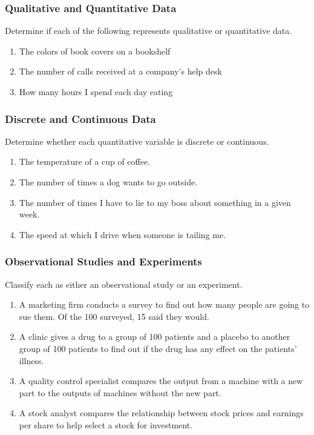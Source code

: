 \documentclass{article}
\newcounter{pset}
\begin{document}
\subsubsection*{Qualitative and Quantitative Data}

Determine if each of the following represents qualitative or quantitative data.
\begin{enumerate} \setcounter{enumi}{\value{pset}}
    \item The colors of book covers on a bookshelf
    \item The number of calls received at a company's help desk
    \item How many hours I spend each day eating
\end{enumerate}     \setcounter{pset}{\value{enumi}}

\subsubsection*{Discrete and Continuous Data}

Determine whether each quantitative variable is discrete or continuous.
\begin{enumerate} \setcounter{enumi}{\value{pset}}
    \item The temperature of a cup of coffee.
    \item The number of times a dog wants to go outside.
    \item The number of times I have to lie to my boss about something in a given week.
    \item The speed at which I drive when someone is tailing me.
\end{enumerate}     \setcounter{pset}{\value{enumi}}

\subsubsection*{Observational Studies and Experiments}

Classify each as either an observational study or an experiment.
\begin{enumerate} \setcounter{enumi}{\value{pset}}
    \item A marketing firm conducts a survey to find out how many people are going to sue them. Of the 100 surveyed, 15 said they would.
    \item A clinic gives a drug to a group of 100 patients and a placebo to another group of 100 patients to find out if the drug has any effect on the patients' illness.
    \item A quality control specialist compares the output from a machine with a new part to the outputs of machines without the new part.
    \item A stock analyst compares the relationship between stock prices and earnings per share to help select a stock for investment.
\end{enumerate}     \setcounter{pset}{\value{enumi}}
\end{document}
